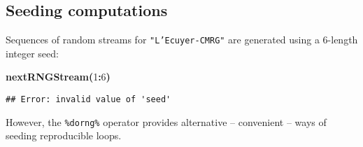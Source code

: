 \documentclass[a4paper,12pt]{article}\usepackage{graphicx, color}
\makeatletter
\newcommand{\hlnumber}[1]{\textcolor[rgb]{0,0,0}{#1}}%
\newcommand{\hlfunctioncall}[1]{\textcolor[rgb]{0.501960784313725,0,0.329411764705882}{\textbf{#1}}}%
\newcommand{\hlkeyword}[1]{\textcolor[rgb]{0,0,0}{\textbf{#1}}}%
\newenvironment{kframe}{%
 \def\FrameCommand##1{\hskip\@totalleftmargin \hskip-\fboxsep
 \colorbox{shadecolor}{##1}\hskip-\fboxsep
     \hskip-\linewidth \hskip-\@totalleftmargin \hskip\columnwidth}%
 \MakeFramed {\advance\hsize-\width
   \@totalleftmargin\z@ \linewidth\hsize
   \@setminipage}}%
 {\par\unskip\endMakeFramed}
\newenvironment{knitrout}{}{} %
\renewenvironment{knitrout}{\begin{footnotesize}}{\end{footnotesize}}
\let\code=\texttt
\makeatother
\begin{document}
\subsection{Seeding computations}

Sequences of random streams for \code{"L'Ecuyer-CMRG"} are generated
using a 6-length integer seed:
\begin{knitrout}
\color{fgcolor}\begin{kframe}
\begin{flushleft}
\ttfamily\noindent
\hlfunctioncall{nextRNGStream}\hlkeyword{(}\hlnumber{1}\hlkeyword{:}\hlnumber{6}\hlkeyword{)}\mbox{}
\normalfont
\end{flushleft}
\begin{verbatim}
## Error: invalid value of 'seed'
\end{verbatim}
\end{kframe}
\end{knitrout}


However, the \code{\%dorng\%} operator provides alternative -- convenient --
ways of seeding reproducible loops.
\end{document}
